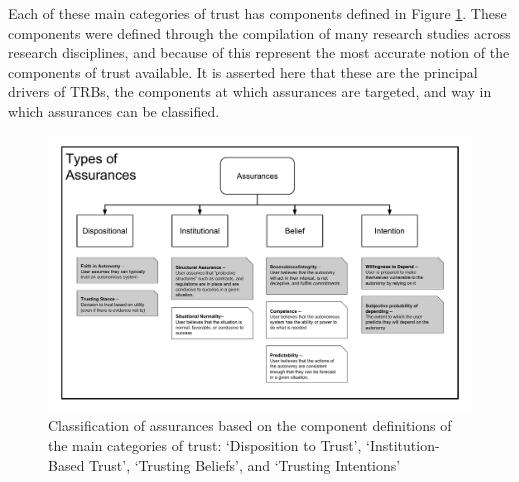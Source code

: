         Each of these main categories of trust has components defined in Figure \ref{fig:Assurance_classes}. These components were defined through the compilation of many research studies across research disciplines, and because of this represent the most accurate notion of the components of trust available. It is asserted here that these are the principal drivers of TRBs, the components at which assurances are targeted, and way in which assurances can be classified.

        \begin{figure}
            \includegraphics[width=8in]{Figures/Assurances.pdf}%
            \caption{Classification of assurances based on the component definitions of the main categories of trust: `Disposition to Trust', `Institution-Based Trust', `Trusting Beliefs', and `Trusting Intentions'}
            \label{fig:Assurance_classes}
        \end{figure}
